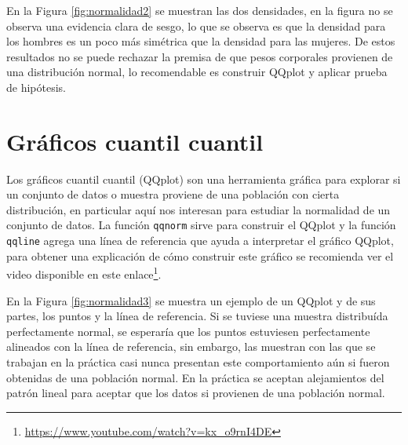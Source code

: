 \documentclass[
]{book}
\renewcommand{\href}[2]{#2\footnote{\url{#1}}}
\begin{document}
En la Figura \ref{fig:normalidad2} se muestran las dos densidades, en la figura no se observa una evidencia clara de sesgo, lo que se observa es que la densidad para los hombres es un poco más simétrica que la densidad para las mujeres. De estos resultados no se puede rechazar la premisa de que pesos corporales provienen de una distribución normal, lo recomendable es construir QQplot y aplicar prueba de hipótesis.

\hypertarget{gruxe1ficos-cuantil-cuantil}{%
\section{\texorpdfstring{Gráficos cuantil cuantil   }{Gráficos cuantil cuantil   }}\label{gruxe1ficos-cuantil-cuantil}}

Los gráficos cuantil cuantil (QQplot) son una herramienta gráfica para explorar si un conjunto de datos o muestra proviene de una población con cierta distribución, en particular aquí nos interesan para estudiar la normalidad de un conjunto de datos. La función \texttt{qqnorm} sirve para construir el QQplot y la función \texttt{qqline} agrega una línea de referencia que ayuda a interpretar el gráfico QQplot, para obtener una explicación de cómo construir este gráfico se recomienda ver el video disponible en este \href{https://www.youtube.com/watch?v=kx_o9rnI4DE}{enlace}.

En la Figura \ref{fig:normalidad3} se muestra un ejemplo de un QQplot y de sus partes, los puntos y la línea de referencia. Si se tuviese una muestra distribuída perfectamente normal, se esperaría que los puntos estuviesen perfectamente alineados con la línea de referencia, sin embargo, las muestran con las que se trabajan en la práctica casi nunca presentan este comportamiento aún si fueron obtenidas de una población normal. En la práctica se aceptan alejamientos del patrón lineal para aceptar que los datos si provienen de una población normal.
\end{document}
